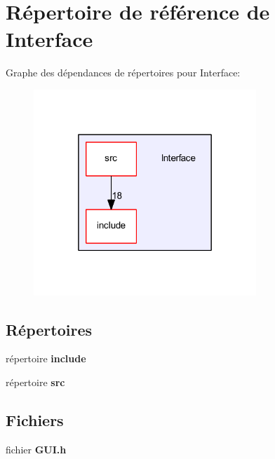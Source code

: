 \section{Répertoire de référence de Interface}
\label{dir_b7263c2df3abed61e1897d5e9e534860}
Graphe des dépendances de répertoires pour Interface\+:\nopagebreak
\begin{figure}[H]
\begin{center}
\leavevmode
\includegraphics[width=238pt]{dir_b7263c2df3abed61e1897d5e9e534860_dep}
\end{center}
\end{figure}
\subsection*{Répertoires}
\begin{DoxyCompactItemize}
\item 
répertoire {\bf include}
\item 
répertoire {\bf src}
\end{DoxyCompactItemize}
\subsection*{Fichiers}
\begin{DoxyCompactItemize}
\item 
fichier {\bf G\+U\+I.\+h}
\end{DoxyCompactItemize}
